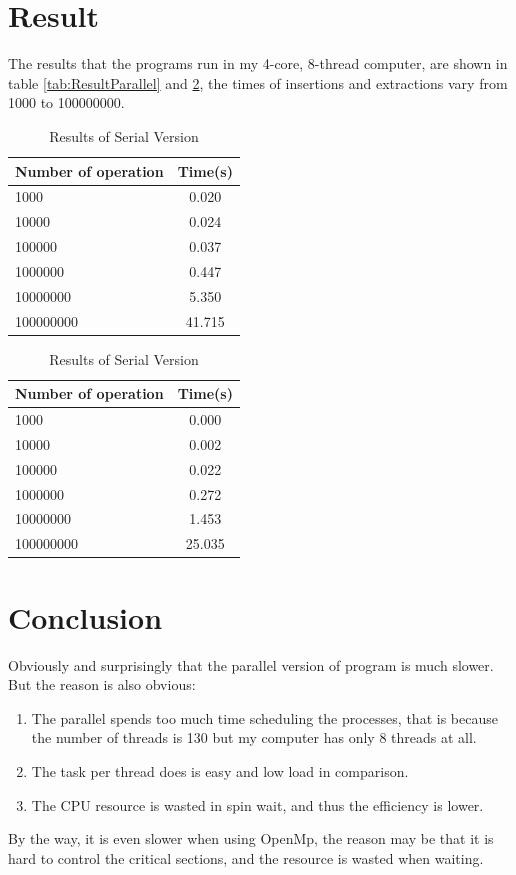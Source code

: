 \documentclass{article}
\begin{document}
	\section{Result} %
	\label{sec:result}
	The results that the programs run in my 4-core, 8-thread computer, are shown in table \ref{tab:ResultParallel} and \ref{tab:ResultSerial}, the times of insertions and extractions vary from 1000 to 100000000.
	\begin{table}[H]
		\begin{minipage}{0.48\linewidth}
			\centering
			\caption{Results of Parallel Version}	
			\begin{tabular}{|l|c|}
			\hline
			Number of operation & Time(s) \\
			\hline 
			1000 & 0.020\\
			10000 & 0.024\\
			100000 & 0.037\\
			1000000 & 0.447\\
			10000000 & 5.350\\
			100000000 & 41.715\\
			\hline
			\end{tabular}
			\label{tab:ResultParallel}
		\end{minipage}
		\begin{minipage}{0.48\linewidth}
			\caption{Results of Serial Version}	
			\begin{tabular}{|l|c|}
			\hline
			Number of operation & Time(s) \\
			\hline 
			1000 & 0.000\\
			10000 & 0.002\\
			100000 & 0.022\\
			1000000 & 0.272\\
			10000000 & 1.453\\
			100000000 & 25.035\\
			\hline
			\end{tabular}
			\label{tab:ResultSerial}
		\end{minipage}
	\end{table}
	
	\section{Conclusion} %
	\label{sec:conclusion}
	Obviously and surprisingly that the parallel version of program is much slower. But the reason is also obvious: 
	\begin{enumerate}[1.]
	\item The parallel spends too much time scheduling the processes, that is because the number of threads is 130 but my computer has only 8 threads at all. 
	\item The task per thread does is easy and low load in comparison. 
	\item The CPU resource is wasted in spin wait, and thus the efficiency is lower.
	\end{enumerate}
	\par By the way, it is even slower when using OpenMp, the reason may be that it is hard to control the critical sections, and the resource is wasted when waiting.
\end{document}
